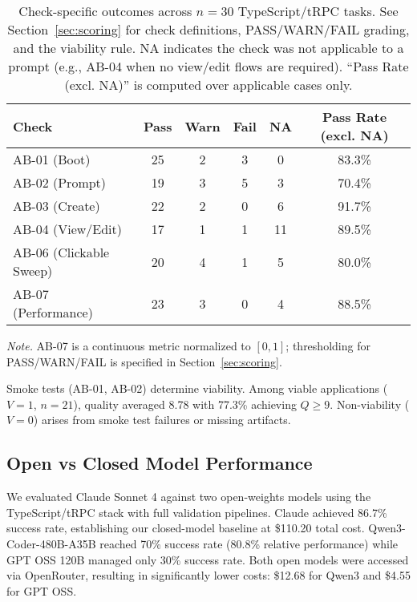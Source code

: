 \documentclass{article}
\begin{document}
\begin{table}[t]
\caption{Check-specific outcomes across $n=30$ TypeScript/tRPC tasks. See Section~\ref{sec:scoring} for check definitions, PASS/WARN/FAIL grading, and the viability rule. NA indicates the check was not applicable to a prompt (e.g., AB-04 when no view/edit flows are required). ``Pass Rate (excl. NA)'' is computed over applicable cases only.}
\label{tab:check-pass-rates}
\centering
\begin{threeparttable}
\begin{tabular}{lccccc}
\toprule
Check & Pass & Warn & Fail & NA & Pass Rate (excl. NA) \\
\midrule
AB-01 (Boot) & 25 & 2 & 3 & 0 & 83.3\% \\
AB-02 (Prompt) & 19 & 3 & 5 & 3 & 70.4\% \\
AB-03 (Create) & 22 & 2 & 0 & 6 & 91.7\% \\
AB-04 (View/Edit) & 17 & 1 & 1 & 11 & 89.5\% \\
AB-06 (Clickable Sweep) & 20 & 4 & 1 & 5 & 80.0\% \\
AB-07 (Performance) & 23 & 3 & 0 & 4 & 88.5\% \\
\bottomrule
\end{tabular}
\begin{tablenotes}
\item \textit{Note.} AB-07 is a continuous metric normalized to $[0,1]$; thresholding for PASS/WARN/FAIL is specified in Section~\ref{sec:scoring}.
\end{tablenotes}
\end{threeparttable}
\end{table}

Smoke tests (AB-01, AB-02) determine viability. Among viable applications ($V=1$, $n=21$), quality averaged 8.78 with 77.3\% achieving $Q \geq 9$. Non-viability ($V=0$) arises from smoke test failures or missing artifacts.

\subsection{Open vs Closed Model Performance}

We evaluated Claude Sonnet 4 against two open-weights models using the TypeScript/tRPC stack with full validation pipelines. Claude achieved 86.7\% success rate, establishing our closed-model baseline at \$110.20 total cost. Qwen3-Coder-480B-A35B reached 70\% success rate (80.8\% relative performance) while GPT OSS 120B managed only 30\% success rate. Both open models were accessed via OpenRouter, resulting in significantly lower costs: \$12.68 for Qwen3 and \$4.55 for GPT OSS.
\end{document}
